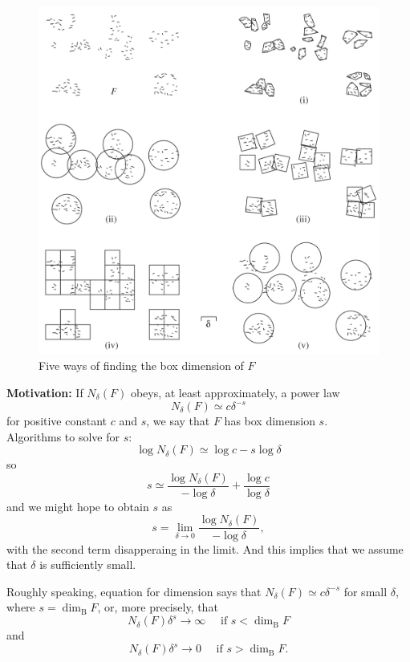 \documentclass[12pt, a4paper]{article}
\begin{document}
\begin{figure}[t]
    \centering
    \includegraphics[width=.66\textwidth]{images/bcd-def-vis.png}
    \caption{Five ways of finding the box dimension of $F$}
    \label{fig:bcd-def-vis}
\end{figure}


\textbf{Motivation:}
If $N_\delta(F)$ obeys, at least approximately, a power law
$$N_{\delta}(F) \simeq c \delta^{-s}$$
for positive constant $c$ and $s$, we say that $F$ has box dimension $s$.
\\
Algorithms to solve for $s$:
$$
\log N_{\delta}(F) \simeq \log c-s \log \delta
$$
so
$$
s \simeq \frac{\log N_{\delta}(F)}{-\log \delta}+\frac{\log c}{\log \delta}
$$
and we might hope to obtain $s$ as
$$
s=\lim _{\delta \rightarrow 0} \frac{\log N_{\delta}(F)}{-\log \delta},
$$
with the second term disapperaing in the limit. And this implies that we assume that $\delta$ is sufficiently small. 


Roughly speaking, equation for dimension says that $N_{\delta}(F) \simeq c \delta^{-s}$ for small $\delta$, where $s=\operatorname{dim}_{\mathrm{B}} F$, or, more precisely, that
$$
N_{\delta}(F) \delta^{s} \rightarrow \infty \quad \text { if } s<\operatorname{dim}_{\mathrm{B}} F
$$
and
$$
N_{\delta}(F) \delta^{s} \rightarrow 0 \quad \text { if } s>\operatorname{dim}_{\mathrm{B}} F .
$$
\end{document}
